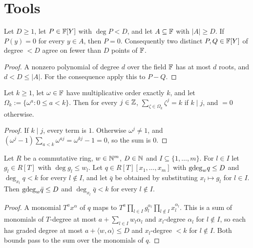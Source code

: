 \section{Tools}

\begin{lemma}\label{lem:roots}
Let $D\ge1$, let $P\in\mathbb{F}[Y]$ with $\deg P<D$, and let $A\subseteq\mathbb{F}$ with $|A|\ge D$. If
$P(y)=0$ for every $y\in A$, then $P=0$. Consequently two distinct $P,Q\in\mathbb{F}[Y]$ of degree $<D$
agree on fewer than $D$ points of $\mathbb{F}$.
\end{lemma}

\begin{proof}
A nonzero polynomial of degree $d$ over the field $\mathbb{F}$ has at most $d$ roots, and $d<D\le|A|$.
For the consequence apply this to $P-Q$.
\end{proof}

\begin{lemma}\label{lem:rootsum}
Let $k\ge1$, let $\omega\in\mathbb{F}$ have multiplicative order exactly $k$, and let
$\Omega_k:=\{\omega^a:0\le a<k\}$. Then for every $j\in\mathbb{Z}$,
$\sum_{\zeta\in\Omega_k}\zeta^j=k$ if $k\mid j$, and $=0$ otherwise.
\end{lemma}

\begin{proof}
If $k\mid j$, every term is $1$. Otherwise $\omega^j\ne1$, and
$(\omega^j-1)\sum_{a<k}\omega^{aj}=\omega^{kj}-1=0$, so the sum is $0$.
\end{proof}

\begin{lemma}\label{lem:subst}
Let $R$ be a commutative ring, $w\in\mathbb{N}^m$, $D\in\mathbb{N}$ and $I\subseteq\{1,\dots,m\}$. For $l\in I$
let $g_l\in R[T]$ with $\deg g_l\le w_l$. Let $q\in R[T][x_1,\dots,x_m]$ with $\mathrm{gdeg}_wq\le D$ and
$\deg_{x_l}q<k$ for every $l\notin I$, and let $\bar q$ be obtained by substituting $x_l\mapsto g_l$
for $l\in I$. Then $\mathrm{gdeg}_w\bar q\le D$ and $\deg_{x_l}\bar q<k$ for every $l\notin I$.
\end{lemma}

\begin{proof}
A monomial $T^ax^\alpha$ of $q$ maps to
$T^a\prod_{l\in I}g_l^{\alpha_l}\prod_{l\notin I}x_l^{\alpha_l}$. This is a sum of monomials of
$T$-degree at most $a+\sum_{l\in I}w_l\alpha_l$ and $x_l$-degree $\alpha_l$ for $l\notin I$, so
each has graded degree at most $a+\langle w,\alpha\rangle\le D$ and $x_l$-degree $<k$ for
$l\notin I$. Both bounds pass to the sum over the monomials of $q$.
\end{proof}
